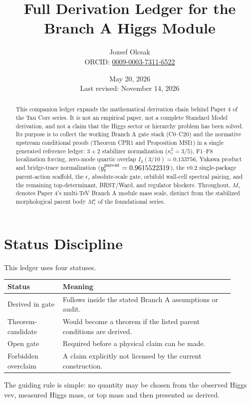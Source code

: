 \documentclass[11pt]{article}
\title{Full Derivation Ledger for the Branch A Higgs Module}
\author{Jozsef Olcsak\\{\small ORCID: \href{https://orcid.org/0009-0003-7311-6522}{0009-0003-7311-6522}}}
\date{May 20, 2026\\Last revised: November 14, 2026}
\begin{document}
\maketitle

\begin{abstract}
This companion ledger expands the mathematical derivation chain behind Paper 4
of the Tau Core series.  It is not an empirical paper, not a complete Standard
Model derivation, and not a claim that the Higgs sector or hierarchy problem
has been solved.  Its purpose is to collect the working Branch A gate stack
(C0--C20) and the normative upstream conditional proofs (Theorem CPR1 and
Proposition MSI1) in a single generated reference ledger: $3+2$ stabilizer
normalization ($\kappa_\tau^2=3/5$), F1--F8 localization forcing,
zero-mode quartic overlap $I_4(3/10)=0.133756$, Yukawa product and
bridge-trace normalization ($y_t^{\rm parent}=0.9615522319$), the v0.2
single-package parent-action scaffold, the $\epsilon_\tau$ absolute-scale gate,
orbifold wall-cell spectral pairing, and the remaining top-determinant,
BRST/Ward, and regulator blockers.  Throughout, $M_\tau$ denotes Paper 4's
multi-TeV Branch A module mass scale, distinct from the stabilized
morphological parent body $M_\tau^\star$ of the foundational series.
\end{abstract}

\tableofcontents

\section{Status Discipline}
This ledger uses four statuses.

\begin{longtable}{p{0.22\linewidth}p{0.68\linewidth}}
\toprule
\textbf{Status} & \textbf{Meaning}\\
\midrule
Derived in gate & Follows inside the stated Branch A assumptions or audit.\\
Theorem-candidate & Would become a theorem if the listed parent conditions are derived.\\
Open gate & Required before a physical claim can be made.\\
Forbidden overclaim & A claim explicitly not licensed by the current construction.\\
\bottomrule
\end{longtable}

The guiding rule is simple: no quantity may be chosen from the observed Higgs
vev, measured Higgs mass, or top mass and then presented as derived.
\end{document}
